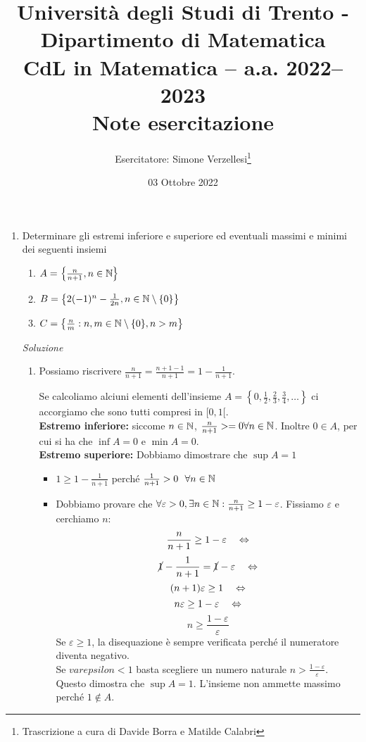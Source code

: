 \documentclass{article}
\title{Università degli Studi di Trento - Dipartimento di Matematica\\
CdL in Matematica – a.a. 2022–2023\\ Note esercitazione}
\author{Esercitatore: Simone Verzellesi\thanks{Trascrizione a cura di Davide Borra e Matilde Calabri}}
\date{03 Ottobre 2022}
\begin{document}
\maketitle
{}
\begin{enumerate}[label=\textbf{Esercizio 3.\arabic*.},itemindent=*]
    \item Determinare gli estremi inferiore e superiore ed eventuali massimi e minimi dei seguenti insiemi 
    \begin{enumerate}
        \item $A=\left\{\frac{n}{n+1},n\in \mathbb{N}\right\}$
        \item $B=\left\{2(-1)^n-\frac{1}{2n}, n\in \mathbb{N}\setminus \{0\}\right\}$
        \item $C=\left\{\frac{n}{m}: n, m\in \mathbb{N}\setminus\{0\},n>m\right\}$
    \end{enumerate}
    \item[\textit{\large Soluzione~}]~
    \begin{enumerate}
        \item \begin{oss}
            Possiamo riscrivere $\frac{n}{n+1}=\frac{n+1-1}{n+1}=1-\frac{1}{n+1}$.
        \end{oss}
        Se calcoliamo alciuni elementi dell'insieme $A=\left\{0, \frac{1}{2}, \frac{2}{3}, \frac{3}{4},\dots\right\}$ ci accorgiamo che sono tutti compresi in $[0,1[$.\\
        \textbf{Estremo inferiore:} siccome $n\in \mathbb{N}$, $\frac{n}{n+1}>=0\forall n\in \mathbb{N}$. Inoltre $0\in A$, per cui si ha che $\inf A=0$ e $\min A=0$.\\
        \textbf{Estremo superiore:} Dobbiamo dimostrare che $\sup A=1$
        \begin{itemize}
            \item $1\geq 1-\frac{1}{n+1}$ perché $\frac{1}{n+1}>0~~\forall n\in \mathbb{N}$
            \item Dobbiamo provare che $\forall \varepsilon >0, \exists n\in \mathbb{N}:\frac{n}{n+1}\geq 1-\varepsilon$. Fissiamo $\varepsilon$ e cerchiamo $n$: \[\frac{n}{n+1}\geq 1-\varepsilon~~~\Leftrightarrow\]\[\cancel{1}-\frac{1}{n+1}=\cancel{1}-\varepsilon~~~\Leftrightarrow\]\[(n+1)\varepsilon\geq 1~~~\Leftrightarrow\]\[n\varepsilon\geq 1-\varepsilon ~~~\Leftrightarrow\]\[n\geq \frac{1-\varepsilon}{\varepsilon}\]
            Se $\varepsilon \geq 1$, la disequazione è sempre verificata perché il numeratore diventa negativo. \\Se $varepsilon<1$ basta scegliere un numero naturale $n>\frac{1-\varepsilon}{\varepsilon}$.\\Questo dimostra che $\sup A=1$. L'insieme non ammette massimo perché $1\notin A$.

\end{itemize}
\end{enumerate}
\end{enumerate}
\end{document}
